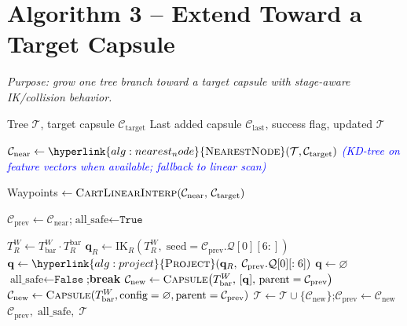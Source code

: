 \documentclass[11pt]{article}
\newcommand{\algorithmicbreak}{\textbf{break}}
\newcommand{\Break}{\State \algorithmicbreak}
\newcommand{\chg}[1]{\textcolor{blue}{#1}}
\newcommand{\AlgTarget}[1]{\hypertarget{#1}{}}
\newcommand{\AlgLink}[2]{\hyperlink{#1}{#2}}
\begin{document}
\section*{Algorithm 3 -- Extend Toward a Target Capsule}
\noindent\textit{Purpose: grow one tree branch toward a target capsule with stage-aware IK/collision behavior.}
\AlgTarget{alg:cart_extend_toward}
\begin{algorithm}[H]
\caption{\textsc{CartExtendToward}($\mathcal{T},\, \mathcal{C}_{\text{target}},\,\texttt{enable\_ik}$)}
\begin{algorithmic}[1]
\Require Tree $\mathcal{T}$, target capsule $\mathcal{C}_{\text{target}}$
\Ensure  Last added capsule $\mathcal{C}_{\text{last}}$, success flag, updated $\mathcal{T}$

\State \chg{$\mathcal{C}_{\text{near}} \gets \AlgLink{alg:nearest_node}{\textsc{NearestNode}}(\mathcal{T},\mathcal{C}_{\text{target}})$}
\State \chg{\quad\textit{(KD-tree on feature vectors when available; fallback to linear scan)}}

\State Waypoints $\gets \textsc{CartLinearInterp}(\mathcal{C}_{\text{near}},\, \mathcal{C}_{\text{target}})$
\quad{}

\State $\mathcal{C}_{\text{prev}} \gets \mathcal{C}_{\text{near}}$;\quad $\text{all\_safe} \gets \texttt{True}$

    \State $T^W_R \gets T^W_{\text{bar}} \cdot T_R^{\text{bar}}$
    \State $\mathbf{q}_R \gets \text{IK}_R\!\left(T^W_R,\; \text{seed} = \mathcal{C}_{\text{prev}}.\mathcal{Q}[0][6:]\right)$
      \State $\mathbf{q} \gets \AlgLink{alg:project}{\textsc{Project}}\!\left(\mathbf{q}_R,\; \mathcal{C}_{\text{prev}}.\mathcal{Q}[0][:6]\right)$
    \Else
      \State $\mathbf{q} \gets \varnothing$
    \EndIf
      \State $\text{all\_safe} \gets \texttt{False}$;\quad \Break
    \EndIf
    \State $\mathcal{C}_{\text{new}} \gets \textsc{Capsule}\!\left(T^W_{\text{bar}},\,[\mathbf{q}],\,\text{parent}=\mathcal{C}_{\text{prev}}\right)$
  \Else
    \State \chg{$\mathcal{C}_{\text{new}} \gets \textsc{Capsule}(T^W_{\text{bar}},\text{config}=\varnothing,\text{parent}=\mathcal{C}_{\text{prev}})$}
  \EndIf
  \State $\mathcal{T} \gets \mathcal{T} \cup \{\mathcal{C}_{\text{new}}\}$;\quad $\mathcal{C}_{\text{prev}} \gets \mathcal{C}_{\text{new}}$
\EndFor
\State \Return $\mathcal{C}_{\text{prev}},\; \text{all\_safe},\; \mathcal{T}$
\end{algorithmic}
\end{algorithm}
\end{document}
